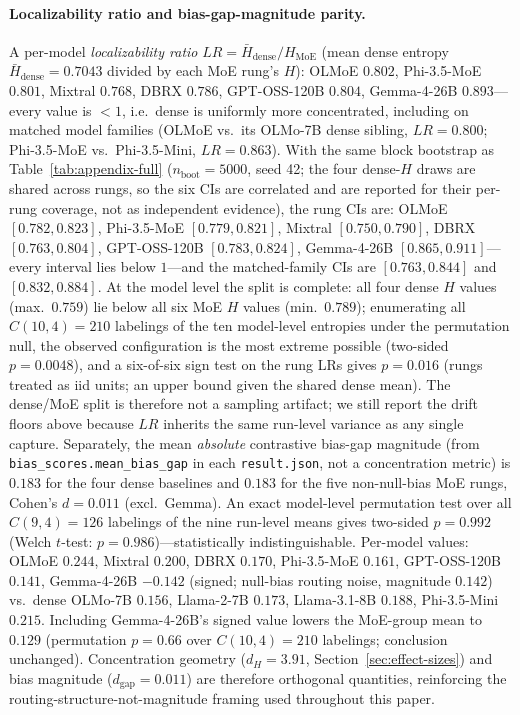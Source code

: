 \documentclass[sigconf]{acmart}
\begin{document}
\paragraph{Localizability ratio and bias-gap-magnitude parity.}
A per-model \emph{localizability ratio} $LR = \bar H_{\text{dense}}/H_{\text{MoE}}$
(mean dense entropy $\bar H_{\text{dense}} = 0.7043$ divided by each MoE
rung's $H$): OLMoE $0.802$, Phi-3.5-MoE $0.801$, Mixtral $0.768$, DBRX
$0.786$, GPT-OSS-120B $0.804$, Gemma-4-26B $0.893$---every value is
$<1$, i.e.\ dense is uniformly more concentrated, including on matched
model families (OLMoE vs.\ its OLMo-7B dense sibling, $LR=0.800$;
Phi-3.5-MoE vs.\ Phi-3.5-Mini, $LR=0.863$). With the same block bootstrap
as Table~\ref{tab:appendix-full} ($n_{\mathrm{boot}}=5000$, seed 42; the
four dense-$H$ draws are shared across rungs, so the six CIs are
correlated and are reported for their per-rung coverage, not as
independent evidence), the rung CIs are: OLMoE $[0.782, 0.823]$,
Phi-3.5-MoE $[0.779, 0.821]$, Mixtral $[0.750, 0.790]$, DBRX
$[0.763, 0.804]$, GPT-OSS-120B $[0.783, 0.824]$, Gemma-4-26B
$[0.865, 0.911]$---every interval lies below $1$---and the matched-family
CIs are $[0.763, 0.844]$ and $[0.832, 0.884]$.
At the model level the split is complete: all four dense
$H$ values (max.\ $0.759$) lie below all six MoE $H$ values (min.\
$0.789$); enumerating all $C(10,4) = 210$ labelings of the ten model-level
entropies under the permutation null, the observed configuration is the
most extreme possible (two-sided $p = 0.0048$), and a six-of-six sign
test on the rung LRs gives $p = 0.016$ (rungs treated as iid units; an
upper bound given the shared dense mean). The dense/MoE split is
therefore not a sampling artifact; we still report the drift floors above
because $LR$ inherits the same run-level variance as any single capture.
Separately, the
mean \emph{absolute} contrastive bias-gap magnitude (from
\texttt{bias\_scores.mean\_bias\_gap} in each \texttt{result.json}, not a
concentration metric) is $0.183$ for the four dense baselines and
$0.183$ for the five non-null-bias MoE rungs, Cohen's $d = 0.011$
(excl.\ Gemma). An exact model-level permutation test over all
$C(9,4) = 126$ labelings of the nine run-level means gives two-sided
$p = 0.992$ (Welch $t$-test: $p = 0.986$)---statistically
indistinguishable. Per-model values: OLMoE $0.244$, Mixtral $0.200$, DBRX
$0.170$, Phi-3.5-MoE $0.161$, GPT-OSS-120B $0.141$, Gemma-4-26B $-0.142$
(signed; null-bias routing noise, magnitude $0.142$) vs.\ dense OLMo-7B
$0.156$, Llama-2-7B $0.173$, Llama-3.1-8B
$0.188$, Phi-3.5-Mini $0.215$. Including Gemma-4-26B's signed value
lowers the MoE-group mean to $0.129$ (permutation $p = 0.66$ over
$C(10,4) = 210$ labelings; conclusion unchanged). Concentration geometry
($d_H = 3.91$, Section~\ref{sec:effect-sizes}) and bias magnitude
($d_{\text{gap}} =
0.011$) are therefore orthogonal quantities, reinforcing the
routing-structure-not-magnitude framing used throughout this paper.
\end{document}

